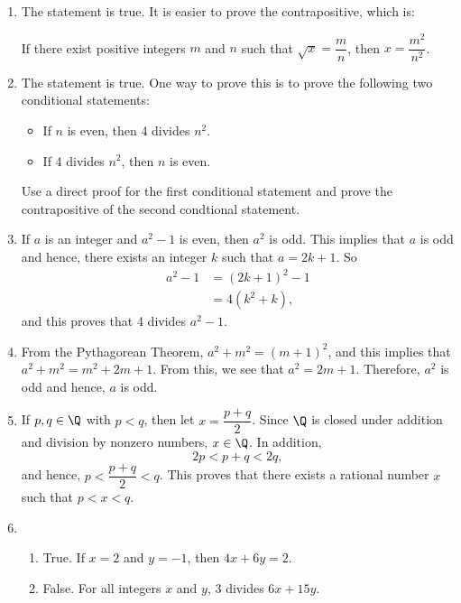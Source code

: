 \begin{enumerate}
\item  The statement is true.  It is easier to prove the contrapositive, which is:

If there exist positive integers $m$ and $n$ such that $\sqrt{x} = \dfrac{m}{n}$, then 
$x = \dfrac{m^2}{n^2}$.



\item The statement is true.  One way to prove this is to prove the following two conditional statements:
\begin{itemize}
\item If $n$ is even, then 4 divides $n^2$.
\item If 4 divides $n^2$, then $n$ is even.
\end{itemize}
Use a direct proof for the first conditional statement and prove the contrapositive of the second condtional statement.


\item If $a$ is an integer and $a^2 - 1$ is even, then $a^2$ is odd.  This implies that $a$ is odd and hence, there exists an integer $k$ such that $a = 2k + 1$.  So
\begin{align*}
a^2 - 1 &= (2k + 1)^2 - 1 \\
        &= 4(k^2 + k),
\end{align*}
and this proves that 4 divides $a^2 - 1$.


\item From the Pythagorean Theorem, $a^2 + m^2 = (m + 1)^2$, and this implies that 
$a^2 + m^2 = m^2 + 2m + 1$.  From this, we see that $a^2 = 2m + 1$.  Therefore, $a^2$ is odd and hence, $a$ is odd.


\item If $p, q \in \Q$ with $p < q$, then let $x = \dfrac{p + q}{2}$.  Since $\Q$ is closed under addition and division by nonzero numbers, $x \in \Q$.  In addition,
\[
2p < p + q  < 2q,
\]
and hence, $p < \dfrac{p + q}{2} < q$.  This proves that there exists a rational number $x$ such that $p < x < q$.


\item \begin{enumerate}
\item True. If $x = 2$ and $y = -1$, then $4x + 6y = 2$.

\item False.  For all integers $x$ and $y$, 3 divides $6x + 15y$.


\end{enumerate}
\end{enumerate}
